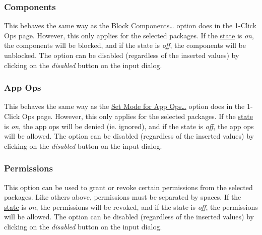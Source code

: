 \subsubsection{Components} %
This behaves the same way as the \hyperref[subsec:block-components-dots]{Block Components\dots} option does in the
1-Click Ops page. However, this only applies for the selected packages. If the \hyperref[subsubsec:profile-state]{state}
is \textit{on}, the components will be blocked, and if the state is \textit{off}, the components will be unblocked.
The option can be disabled (regardless of the inserted values) by clicking on the \textit{disabled} button on the input
dialog.


\subsubsection{App Ops} %
This behaves the same way as the \hyperref[subsec:set-mode-for-app-ops-dots]{Set Mode for App Ops\dots} option does in
the 1-Click Ops page. However, this only applies for the selected packages. If the
\hyperref[subsubsec:profile-state]{state} is \textit{on}, the app ops will be denied (ie. ignored), and if the state is
\textit{off}, the app ops will be allowed. The option can be disabled (regardless of the inserted values) by clicking
on the \textit{disabled} button on the input dialog.

\subsubsection{Permissions} %
This option can be used to grant or revoke certain permissions from the selected packages. Like others above,
permissions must be separated by spaces. If the \hyperref[subsubsec:profile-state]{state} is \textit{on}, the
permissions will be revoked, and if the state is \textit{off}, the permissions will be allowed. The option can be
disabled (regardless of the inserted values) by clicking on the \textit{disabled} button on the input dialog.

